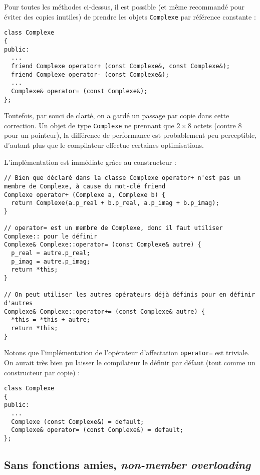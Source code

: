 \documentclass{book}
\newcommand{\inline}[1]{\texttt{#1}}
\begin{document}
\begin{correction}
\vspace{1em}

Pour toutes les méthodes ci-dessus, il est possible (et même recommandé pour éviter des copies inutiles) de prendre les objets \inline{Complexe} par référence constante :
\begin{verbatim}
class Complexe
{
public:
  ...
  friend Complexe operator+ (const Complexe&, const Complexe&);
  friend Complexe operator- (const Complexe&);
  ...
  Complexe& operator= (const Complexe&);
};
\end{verbatim}
Toutefois, par souci de clarté, on a gardé un passage par copie dans cette correction. Un objet de type \inline{Complexe} ne prennant que $2\times 8$ octets (contre $8$ pour un pointeur), la différence de performance est probablement peu perceptible, d'autant plus que le compilateur effectue certaines optimisations.

\vspace{1em}

L'implémentation est immédiate grâce au constructeur :

\begin{verbatim}
// Bien que déclaré dans la classe Complexe operator+ n'est pas un membre de Complexe, à cause du mot-clé friend
Complexe operator+ (Complexe a, Complexe b) {
  return Complexe(a.p_real + b.p_real, a.p_imag + b.p_imag);
}

// operator= est un membre de Complexe, donc il faut utiliser Complexe:: pour le définir
Complexe& Complexe::operator= (const Complexe& autre) {
  p_real = autre.p_real;
  p_imag = autre.p_imag;
  return *this;
}

// On peut utiliser les autres opérateurs déjà définis pour en définir d'autres
Complexe& Complexe::operator+= (const Complexe& autre) {
  *this = *this + autre;
  return *this;
}
\end{verbatim}

Notons que l'implémentation de l'opérateur d'affectation \inline{operator=} est triviale. On aurait très bien pu laisser le compilateur le définir par défaut (tout comme un constructeur par copie) :
\begin{verbatim}
class Complexe
{
public:
  ...
  Complexe (const Complexe&) = default;
  Complexe& operator= (const Complexe&) = default;
};
\end{verbatim}

\subsection*{Sans fonctions amies, \textit{non-member overloading}}


\end{correction}
\end{document}
